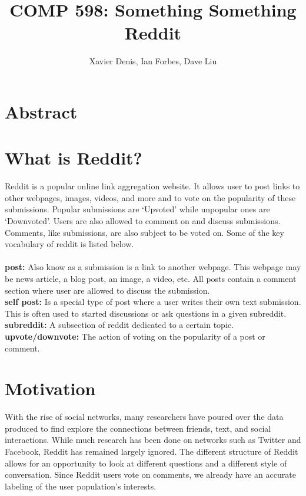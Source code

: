 \documentclass[11pt,twocolumn]{article}
\title {COMP 598: Something Something Reddit}
\author {Xavier Denis, Ian Forbes, Dave Liu}
\begin{document}
\maketitle

\section{Abstract}

\section{What is Reddit?}

Reddit is a popular online link aggregation website. It allows user to post links to other webpages, images, videos, and more and to vote on the popularity of these submissions. Popular submissions are `Upvoted' while unpopular ones are `Downvoted'. Users are also allowed to comment on and discuss submissions. Comments, like submissions, are also subject to be voted on. Some of the key vocabulary of reddit is listed below.
\\
\\
\textbf{post:} Also know as a submission is a link to another webpage. This webpage may be news article, a blog post, an image, a video, etc. All posts contain a comment section where user are allowed to discuss the submission.
\\
\textbf{self post:} Is a special type of post where a user writes their own text submission. This is often used to started discussions or ask questions in a given subreddit. 
\\
\textbf{subreddit:} A subsection of reddit dedicated to a certain topic. 
\\
\textbf{upvote/downvote:} The action of voting on the popularity of a post or comment.

\section{Motivation}
With the rise of social networks, many researchers have poured over the data produced to find explore the connections between friends, text, and social interactions. While much research has been done on networks such as Twitter and Facebook, Reddit has remained largely ignored. The different structure of Reddit allows for an opportunity to look at different questions and a different style of conversation. Since Reddit users vote on comments, we already have an accurate labeling of the user population's interests. 
\end{document}
